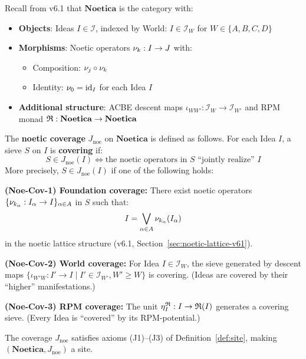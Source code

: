 \begin{definition}
\label{def:noetica-recap}
Recall from v6.1 that $\mathbf{Noetica}$ is the category with:
\begin{itemize}
  \item \textbf{Objects}: Ideas $I \in \mathcal{I}$, indexed by World: $I \in \mathcal{I}_W$
        for $W \in \{A, B, C, D\}$
  \item \textbf{Morphisms}: Noetic operators $\nu_{k} : I \to J$ with:
        \begin{itemize}
          \item Composition: $\nu_{j} \circ \nu_{k}$
          \item Identity: $\nu_{0} = \mathrm{id}_I$ for each Idea $I$
        \end{itemize}
  \item \textbf{Additional structure}: ACBE descent maps $\iota_{WW'} : \mathcal{I}_W \to \mathcal{I}_{W'}$
        and RPM monad $\mathfrak{R} : \mathbf{Noetica} \to \mathbf{Noetica}$
\end{itemize}
\end{definition}

\begin{definition}
\label{def:noetic-coverage}
The \textbf{noetic coverage} $J_{\mathrm{noe}}$ on $\mathbf{Noetica}$ is defined as follows.
For each Idea $I$, a sieve $S$ on $I$ is \textbf{covering} if:
\[
  S \in J_{\mathrm{noe}}(I) \iff
  \text{the noetic operators in } S \text{ ``jointly realize'' } I
\]
More precisely, $S \in J_{\mathrm{noe}}(I)$ if one of the following holds:

\textbf{(Noe-Cov-1) Foundation coverage:} There exist noetic operators
$\{\nu_{k_\alpha} : I_\alpha \to I\}_{\alpha \in A}$ in $S$ such that:
\[
  I = \bigvee_{\alpha \in A} \nu_{k_\alpha}(I_\alpha)
\]
in the noetic lattice structure (v6.1, Section~\ref{sec:noetic-lattice-v61}).

\textbf{(Noe-Cov-2) World coverage:} For Idea $I \in \mathcal{I}_W$, the sieve
generated by descent maps $\{\iota_{W'W} : I' \to I \mid I' \in \mathcal{I}_{W'}, W' \geq W\}$
is covering. (Ideas are covered by their ``higher'' manifestations.)

\textbf{(Noe-Cov-3) RPM coverage:} The unit $\eta^{\mathfrak{R}}_I : I \to \mathfrak{R}(I)$
generates a covering sieve. (Every Idea is ``covered'' by its RPM-potential.)
\end{definition}

\begin{proposition}
\label{prop:noetic-coverage-topology}
The coverage $J_{\mathrm{noe}}$ satisfies axioms (J1)--(J3) of Definition~\ref{def:site},
making $(\mathbf{Noetica}, J_{\mathrm{noe}})$ a site.
\end{proposition}

